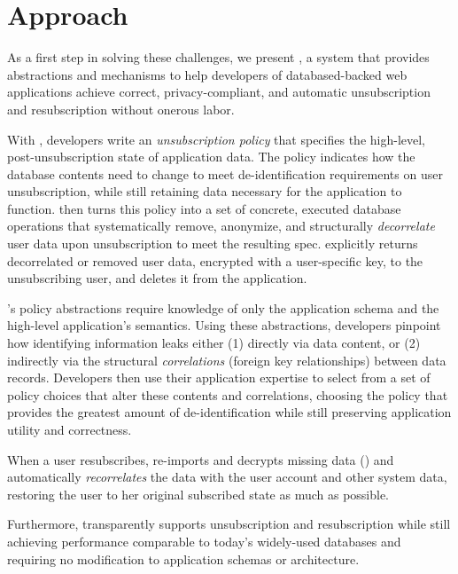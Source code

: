 \section{Approach}
As a first step in solving these challenges, we present \sys, a system that provides abstractions
and mechanisms to help developers of databased-backed web applications achieve correct,
privacy-compliant, and automatic unsubscription and resubscription without onerous labor.

With \sys, developers write an \emph{unsubscription policy} that specifies the high-level,
post-unsubscription state of application data.  The policy indicates how the database contents need
to change to meet de-identification requirements on user unsubscription, while still retaining data
necessary for the application to function. \sys then turns this policy into a set of concrete,
executed database operations that systematically remove, anonymize, and structurally
\emph{decorrelate} user data upon unsubscription to meet the resulting spec. \sys explicitly
returns decorrelated or removed user data, encrypted with a user-specific key, to the unsubscribing user, and
deletes it from the application.

\sys's policy abstractions require knowledge of only the application schema and the high-level
application's semantics. Using these abstractions, developers pinpoint how identifying information
leaks either (1) directly via data content, or (2) indirectly via the structural \emph{correlations}
(foreign key relationships) between data records. Developers then use their application expertise to
select from a set of policy choices that alter these contents and correlations, choosing the policy
that provides the greatest amount of de-identification while still preserving application
utility and correctness.

When a user resubscribes, \sys re-imports and decrypts missing data () and automatically
\emph{recorrelates} the data with the user account and other system data, restoring the user to her
original subscribed state as much as possible.

Furthermore, \sys transparently supports unsubscription and resubscription while still achieving performance
comparable to today’s widely-used databases and requiring no modification to application schemas or
architecture.
